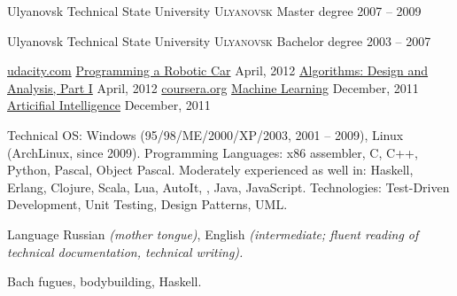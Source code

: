 \documentclass[unicode, 10pt, a4paper, oneside, fleqn]{article}
\begin{document}
\spacedhrule{0.5em}{-0.4em}

\headedsection
  {Ulyanovsk Technical State University}
  {\textsc{Ulyanovsk}} {
  \headedsubsection
    {Master degree}
    {2007 -- 2009} {
    }
  }

\headedsection
  {Ulyanovsk Technical State University}
  {\textsc{Ulyanovsk}} {
  \headedsubsection
    {Bachelor degree}
    {2003 -- 2007} {
    }
  }

\spacedhrule{0.5em}{-0.4em}

\headedsection
  {\href{http://udacity.com}{udacity.com}}
  {} {
  \headedsubsection
    {\href{https://docs.google.com/document/d/1LpUyUwh_gGyPyKf-oxTDOy8ncQejwog1jhgMmtf59mY/edit}
          {Programming a Robotic Car}}
    {April, 2012} {}
  \headedsubsection
    {\href{https://docs.google.com/document/d/1wD_QEJ7mdzxbR_PMVEbZ_tZ0SyakJ_8Y1gBAj_S5Ufg/edit}
          {Algorithms: Design and Analysis, Part I}}
    {April, 2012} {}
  }
\headedsection
  {\href{http://www.coursera.org}{coursera.org}}
  {} {
  \headedsubsection
    {\href{https://docs.google.com/document/d/11OT8thqIgBiwM80D_HjpiGtKTz5CnxiITPG_H6QbuUA/edit}
          {Machine Learning}}
    {December, 2011} {}
  \headedsubsection
    {\href{https://docs.google.com/document/d/1wD_QEJ7mdzxbR_PMVEbZ_tZ0SyakJ_8Y1gBAj_S5Ufg/edit}
          {Articifial Intelligence}}
    {December, 2011} {}
  }

\spacedhrule{0.5em}{-0.4em}


\inlineheadsection  %
  {Technical}
  {OS: Windows (95/98/ME/2000/XP/2003, 2001 -- 2009), Linux (ArchLinux, since 2009).
   Programming Languages: x86 assembler, C, C++, Python, Pascal, Object Pascal.
   Moderately experienced as well in: Haskell, Erlang, Clojure, Scala, Lua, AutoIt, \CS, Java,
   JavaScript. 
   Technologies: Test-Driven Development, Unit Testing, Design Patterns, UML.
  }

\inlineheadsection
  {Language}
  {Russian \emph{(mother tongue)}, English \emph{(intermediate; fluent reading of technical documentation, technical writing).}}

\spacedhrule{1.6em}{-0.4em}


\inlineheadsection
  {Bach fugues, bodybuilding, Haskell.}
\end{document}
